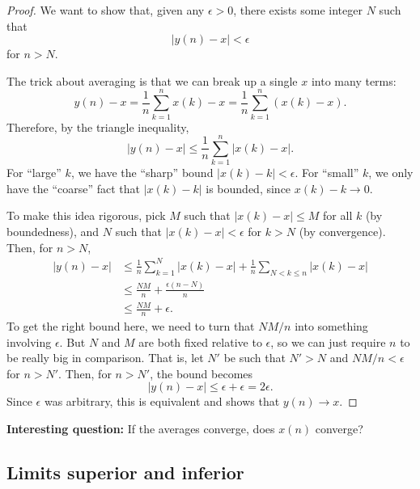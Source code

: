 \documentclass[12pt]{article}
\theoremstyle{definition}
\begin{document}
\begin{proof}
    We want to show that, given any $\epsilon > 0$, there exists some integer
    $N$ such that
    \begin{equation*}
        |y(n) - x| < \epsilon
    \end{equation*}
    for $n > N$.

    The trick about averaging is that we can break up a single $x$ into many
    terms:
    \begin{equation*}
        y(n) - x = \frac{1}{n} \sum_{k = 1}^n x(k) - x = \frac{1}{n} \sum_{k = 1}^n (x(k) - x).
    \end{equation*}
    Therefore, by the triangle inequality,
    \begin{equation*}
        |y(n) - x| \leq \frac{1}{n} \sum_{k = 1}^n |x(k) - x|.
    \end{equation*}
    For ``large'' $k$, we have the ``sharp'' bound $|x(k) - k| < \epsilon$. For
    ``small'' $k$, we only have the ``coarse'' fact that $|x(k) - k|$ is
    bounded, since $x(k) - k \to 0$.

    To make this idea rigorous, pick $M$ such that $|x(k) - x| \leq M$ for all
    $k$ (by boundedness), and $N$ such that $|x(k) - x| < \epsilon$ for $k > N$
    (by convergence). Then, for $n > N$,
    \begin{align*}
        |y(n) - x|
            &\leq \frac{1}{n} \sum_{k = 1}^N |x(k) - x| + \frac{1}{n} \sum_{N < k \leq n} |x(k) - x| \\
            &\leq \frac{NM}{n} + \frac{\epsilon (n - N)}{n} \\
            &\leq \frac{NM}{n} + \epsilon.
    \end{align*}
    To get the right bound here, we need to turn that $NM / n$ into something
    involving $\epsilon$. But $N$ and $M$ are both fixed relative to
    $\epsilon$, so we can just require $n$ to be really big in comparison. That
    is, let $N'$ be such that $N' > N$ and $NM / n < \epsilon$ for $n > N'$.
    Then, for $n > N'$, the bound becomes
    \begin{equation*}
        |y(n) - x| \leq \epsilon + \epsilon = 2\epsilon.
    \end{equation*}
    Since $\epsilon$ was arbitrary, this is equivalent and shows that $y(n) \to
    x$.
\end{proof}

\textbf{Interesting question:} If the averages converge, does $x(n)$ converge?

\subsection*{Limits superior and inferior}%
\label{sub:limits_superior_and_inferior}
\end{document}
